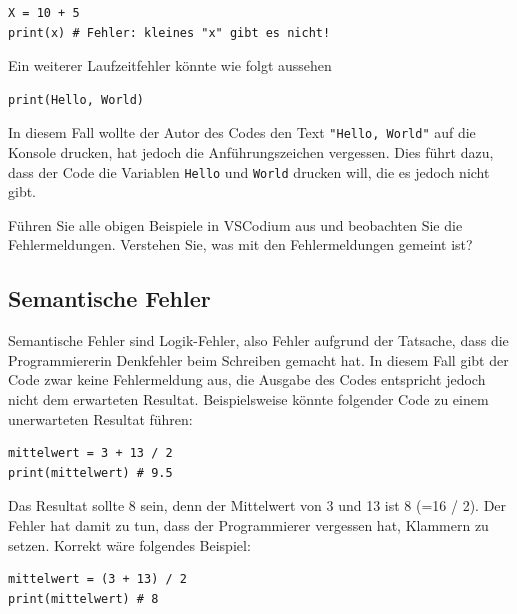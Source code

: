 \begin{lstlisting}
X = 10 + 5
print(x) # Fehler: kleines "x" gibt es nicht!
\end{lstlisting}

Ein weiterer Laufzeitfehler könnte wie folgt aussehen

\begin{lstlisting}
print(Hello, World)
\end{lstlisting}

In diesem Fall wollte der Autor des Codes den Text \lstinline|"Hello, World"| auf die Konsole drucken, hat jedoch die Anführungszeichen vergessen. Dies führt dazu, dass der Code die Variablen \texttt{Hello} und \texttt{World} drucken will, die es jedoch nicht gibt.

\begin{myexercise}
	Führen Sie alle obigen Beispiele in VSCodium aus und beobachten Sie die Fehlermeldungen. Verstehen Sie, was mit den Fehlermeldungen gemeint ist?
\end{myexercise}


\subsection{Semantische Fehler}
\label{subsec:semantische-fehler}
Semantische Fehler sind Logik-Fehler, also Fehler aufgrund der Tatsache, dass die Programmiererin Denkfehler beim Schreiben gemacht hat. In diesem Fall gibt der Code zwar keine Fehlermeldung aus, die Ausgabe des Codes entspricht jedoch nicht dem erwarteten Resultat. Beispielsweise könnte folgender Code zu einem unerwarteten Resultat führen:

\begin{lstlisting}
mittelwert = 3 + 13 / 2
print(mittelwert) # 9.5
\end{lstlisting}
Das Resultat sollte 8 sein, denn der Mittelwert von 3 und 13 ist 8 (=16 / 2). Der Fehler hat damit zu tun, dass der Programmierer vergessen hat, Klammern zu setzen. Korrekt wäre folgendes Beispiel:

\begin{lstlisting}
mittelwert = (3 + 13) / 2
print(mittelwert) # 8
\end{lstlisting}

